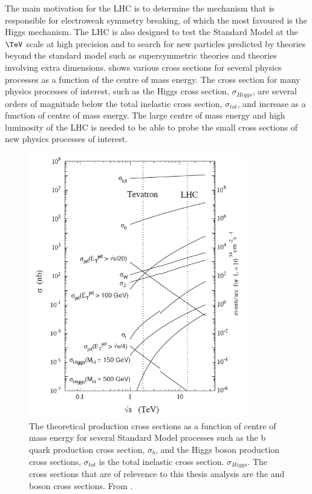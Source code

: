 The main motivation for the LHC is to determine the mechanism that is
responsible for electroweak symmetry breaking, of which the most favoured is the
Higgs mechanism.  The LHC is also designed to test the Standard Model at the
$\TeV$ scale at high precision and to search for new particles predicted by
theories beyond the standard model such as supersymmetric theories and theories
involving extra dimensions.   shows various cross
sections for several physics processes as a function of the centre of mass
energy. The cross section for many physics processes of interest, such as the
Higgs cross section, $\sigma_{Higgs}$, are several orders of magnitude below the
total inelastic cross section, $\sigma_{tot}$, and increase as a function of
centre of mass energy.  The large centre of mass energy and high luminosity of
the LHC is needed to be able to probe the small cross sections of new physics
processes of interest.

\begin{figure}[htbp]
  \centering
  \includegraphics[width=0.85\textwidth]{xsec.png}
  \caption{The theoretical production cross sections as a function of centre of mass energy
for several Standard Model processes such as the b quark production cross
section, $\sigma_{b}$, and the Higgs boson production cross sections,
$\sigma_{tot}$ is the total inelastic cross section.
$\sigma_{Higgs}$. The cross sections that are of relevence to this thesis
analysis are the \PW and \PZ boson cross sections.
From \cite{campbell2006hard}.}
  \label{fig:LHCxsec}
\end{figure}


